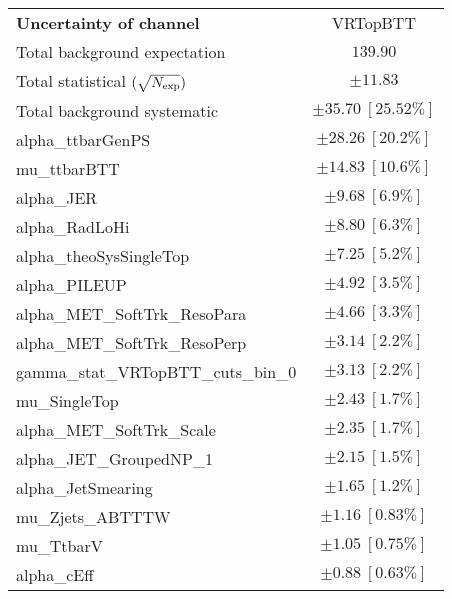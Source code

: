 
\begin{table}
\begin{center}
\setlength{\tabcolsep}{0.0pc}
\begin{tabular*}{\textwidth}{@{\extracolsep{\fill}}lc}
\noalign{\smallskip}\hline\noalign{\smallskip}
{\bf Uncertainty of channel}                                    & VRTopBTT            \\
\noalign{\smallskip}\hline\noalign{\smallskip}
Total background expectation             &  $139.90$       \\
\noalign{\smallskip}\hline\noalign{\smallskip}
Total statistical $(\sqrt{N_{\rm exp}})$              & $\pm 11.83$       \\
Total background systematic               & $\pm 35.70\ [25.52\%] $             \\
\noalign{\smallskip}\hline\noalign{\smallskip}
\noalign{\smallskip}\hline\noalign{\smallskip}
alpha\_ttbarGenPS         & $\pm 28.26\ [20.2\%] $       \\
mu\_ttbarBTT         & $\pm 14.83\ [10.6\%] $       \\
alpha\_JER         & $\pm 9.68\ [6.9\%] $       \\
alpha\_RadLoHi         & $\pm 8.80\ [6.3\%] $       \\
alpha\_theoSysSingleTop         & $\pm 7.25\ [5.2\%] $       \\
alpha\_PILEUP         & $\pm 4.92\ [3.5\%] $       \\
alpha\_MET\_SoftTrk\_ResoPara         & $\pm 4.66\ [3.3\%] $       \\
alpha\_MET\_SoftTrk\_ResoPerp         & $\pm 3.14\ [2.2\%] $       \\
gamma\_stat\_VRTopBTT\_cuts\_bin\_0         & $\pm 3.13\ [2.2\%] $       \\
mu\_SingleTop         & $\pm 2.43\ [1.7\%] $       \\
alpha\_MET\_SoftTrk\_Scale         & $\pm 2.35\ [1.7\%] $       \\
alpha\_JET\_GroupedNP\_1         & $\pm 2.15\ [1.5\%] $       \\
alpha\_JetSmearing         & $\pm 1.65\ [1.2\%] $       \\
mu\_Zjets\_ABTTTW         & $\pm 1.16\ [0.83\%] $       \\
mu\_TtbarV         & $\pm 1.05\ [0.75\%] $       \\
alpha\_cEff         & $\pm 0.88\ [0.63\%] $       \\

\end{tabular*}
\end{center}
\end{table}
